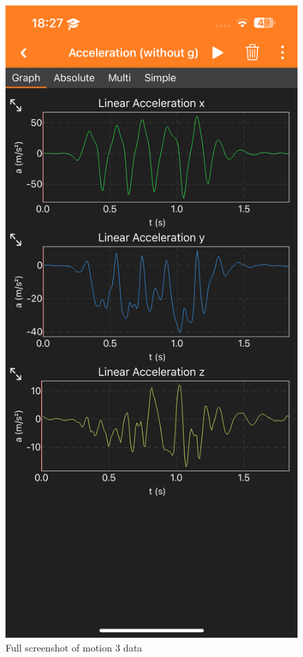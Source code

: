 \documentclass[idxtotoc,hyperref,openany]{labbook} %
\begin{document}
\begin{figure}[H] %
\begin{center}
\includegraphics[width=.55\linewidth]{images/Lab.03/Lab03Motion3.PNG}
\end{center}
\caption{Full screenshot of motion 3 data}
\label{fig:Lab03-Motion3}
\end{figure}
\end{document}
